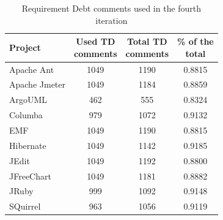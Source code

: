 \begin{table}[!hbt]
    \begin{center}
        \caption{Requirement Debt comments used in the fourth iteration}
        \label{tbl:requirement_comments_fourth_iteration}
        \begin{tabular}{l| c c c }
        \toprule
        \textbf{Project} & \thead{Used TD\\comments} & \thead{Total TD\\comments} & \thead{\% of the \\ total} \\
        \midrule
         Apache Ant    &  1049  & 1190 & 0.8815 \\
         Apache Jmeter &  1049  & 1184 & 0.8859 \\
         ArgoUML       &   462  &  555 & 0.8324 \\
         Columba       &   979  & 1072 & 0.9132 \\
         EMF           &  1049  & 1190 & 0.8815 \\
         Hibernate     &  1049  & 1142 & 0.9185 \\
         JEdit         &  1049  & 1192 & 0.8800 \\
         JFreeChart    &  1049  & 1181 & 0.8882 \\
         JRuby         &   999  & 1092 & 0.9148 \\
         SQuirrel      &   963  & 1056 & 0.9119 \\
        \bottomrule
        \end{tabular}
    \end{center}    
\end{table}

